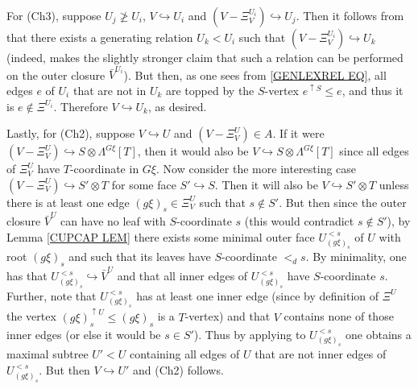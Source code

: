 \documentclass[a4paper,10pt
,draft
]{article}%
\begin{document}
\begin{example}
For (Ch3), suppose $U_j \not \geq U_i$, 
$V \hookrightarrow U_i$ and
$(V - \Xi^{U_i}_V) \hookrightarrow U_j$.
Then it follows from \cite[Lemma 7.37]{Per17}
that there exists a generating relation $U_k < U_i$
such that $(V - \Xi^{U_i}_V) \hookrightarrow U_k$
(indeed, \cite[Lemma 7.37]{Per17} makes the slightly stronger claim that such a relation can be performed on the outer closure $\bar{V}^{U_i}$). But then, as one sees from \eqref{GENLEXREL EQ},
all edges $e$ of $U_i$ that are not in $U_k$ are topped by the $S$-vertex $e^{\uparrow S}\leq e$, and thus it is $e \not \in \Xi^{U_i}$. Therefore $V \hookrightarrow U_k$, as desired.

Lastly, for (Ch2), suppose $V \hookrightarrow U$ and 
$(V - \Xi^{U}_V) \in A$.
If it were 
$(V-\Xi^{U}_V) \hookrightarrow S \otimes \Lambda^{G \xi}[T]$, then it would also be 
$V \hookrightarrow S \otimes \Lambda^{G \xi}[T]$
since all edges of $\Xi^{U}_V$ have 
$T$-coordinate in $G\xi$.
Now consider the more interesting case
$(V - \Xi^{U}_V) \hookrightarrow S' \otimes T$
for some face $S' \hookrightarrow S$.
Then it will also be 
$V \hookrightarrow S' \otimes T$
unless there is at least one edge
$(g \xi)_s \in \Xi^{U}_V$ such that $s \not \in S'$.
But then since the outer closure $\bar{V}^U$ can have no leaf with $S$-coordinate $s$ (this would contradict $s \not \in S'$), 
by Lemma \ref{CUPCAP LEM} there exists some minimal outer face $U_{(g\xi)_s}^{<s}$ of $U$ with root $(g\xi)_s$ and such that its leaves have $S$-coordinate $<_d s$.
By minimality, one has that $U_{(g\xi)_s}^{<s} \hookrightarrow \bar{V}^U$ and that all inner edges of $U_{(g\xi)_s}^{<s}$ have
$S$-coordinate $s$.
Further, note that $U_{(g\xi)_s}^{<s}$
has at least one inner edge
(since by definition of $\Xi^U$ the vertex 
$(g \xi)_s^{\uparrow U} \leq (g \xi)_s$ is a $T$-vertex)
and that $V$ contains none of those inner edges (or else it would be $s \in S'$).
Thus by applying \cite[Lemma 7.34]{Per17}
to $U_{(g\xi)_s}^{<s}$ one obtains a maximal subtree $U' < U$
containing all edges of $U$ that are not inner edges of $U_{(g\xi)_s}^{<s}$.
But then $V \hookrightarrow U'$ and (Ch2) follows.
\end{example}
\end{document}
